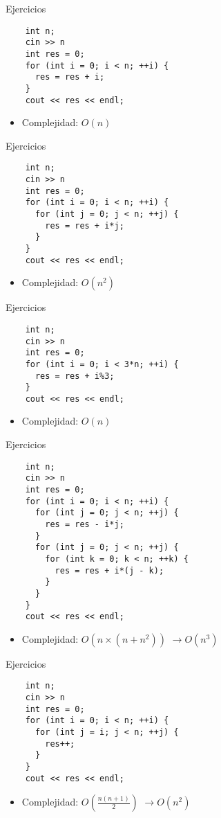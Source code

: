 \documentclass[10pt]{beamer}
\newcommand{\bi}{\begin{itemize}}
\newcommand{\ei}{\end{itemize}}
\begin{document}
\begin{frame}[fragile]{Ejercicios}
  \begin{verbatim}
    int n;
    cin >> n
    int res = 0;
    for (int i = 0; i < n; ++i) {
      res = res + i;
    }
    cout << res << endl;
  \end{verbatim}
  \bi
    \item Complejidad:  $O(n)$
  \ei
\end{frame}

\begin{frame}[fragile]{Ejercicios}
  \begin{verbatim}
    int n;
    cin >> n
    int res = 0;
    for (int i = 0; i < n; ++i) {
      for (int j = 0; j < n; ++j) {
        res = res + i*j;
      }
    }
    cout << res << endl;
  \end{verbatim}
  \bi
    \item Complejidad:  $O(n^2)$
  \ei
\end{frame}

\begin{frame}[fragile]{Ejercicios}
  \begin{verbatim}
    int n;
    cin >> n
    int res = 0;
    for (int i = 0; i < 3*n; ++i) {
      res = res + i%3;
    }
    cout << res << endl;
  \end{verbatim}
  \bi
    \item Complejidad:  $O(n)$
  \ei
\end{frame}

\begin{frame}[fragile]{Ejercicios}
  \begin{verbatim}
    int n;
    cin >> n
    int res = 0;
    for (int i = 0; i < n; ++i) {
      for (int j = 0; j < n; ++j) {
        res = res - i*j;
      }
      for (int j = 0; j < n; ++j) {
        for (int k = 0; k < n; ++k) {
          res = res + i*(j - k);
        }
      }
    }
    cout << res << endl;
  \end{verbatim}
  \bi
    \item Complejidad:  $O(n \times (n + n^2))$  $\rightarrow O(n^3)$
  \ei
\end{frame}

\begin{frame}[fragile]{Ejercicios}
  \begin{verbatim}
    int n;
    cin >> n
    int res = 0;
    for (int i = 0; i < n; ++i) {
      for (int j = i; j < n; ++j) {
        res++;
      }
    }
    cout << res << endl;
  \end{verbatim}
  \bi
    \item Complejidad:  $O(\frac{n(n+1)}{2})$  $\rightarrow O(n^2)$
  \ei
\end{frame}
\end{document}
